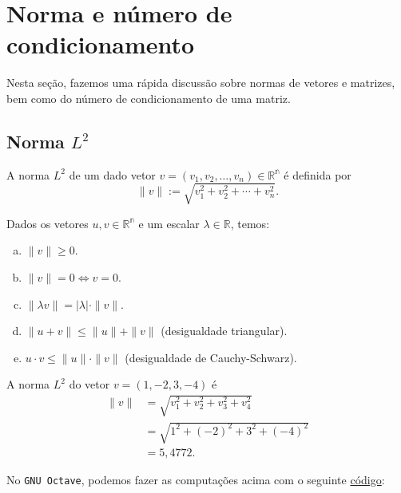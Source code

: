 \section{Norma e número de condicionamento}\label{cap_sl_direto_sec_norma_numcond}

Nesta seção, fazemos uma rápida discussão sobre normas de vetores e matrizes, bem como do número de condicionamento de uma matriz.

\subsection{Norma $L^2$}

A norma $L^2$ de um dado vetor $v = (v_1, v_2, \dotsc, v_n) \in \mathbb{R^n}$ é definida por
\begin{equation}
  \|v\| := \sqrt{v_1^2 + v_2^2 + \cdots + v_n^2}.
\end{equation}

\begin{prop}
  Dados os vetores $u,v \in \mathbb{R^n}$ e um escalar $\lambda\in\mathbb{R}$, temos:
  \begin{enumerate}[a)]
  \item $\|v\| \geq 0$.
  \item $\|v\| = 0 \Leftrightarrow v=0$.
  \item $\|\lambda v\| = |\lambda|\cdot \|v\|$.
  \item $\|u+v\| \leq \|u\| + \|v\|$ (desigualdade triangular).
  \item $u\cdot v \leq \|u\|\cdot\|v\|$ (desigualdade de Cauchy-Schwarz).
  \end{enumerate}
\end{prop}

\begin{ex}\label{ex:norma_vetor}
  A norma $L^2$ do vetor $v = (1, -2, 3, -4)$ é
  \begin{align}
    \|v\| &= \sqrt{v_1^2 + v_2^2 + v_3^2 + v_4^2}\\
    &= \sqrt{1^2 + (-2)^2 + 3^2 + (-4)^2}\\
    &= 5,4772.
  \end{align}

\ifisoctave
No \verb+GNU Octave+, podemos fazer as computações acima com o seguinte \href{https://github.com/phkonzen/notas/blob/master/src/MatematicaNumerica/cap_sl_direto/dados/ex_norma_vetor/ex_norma_vetor.m}{código}:

\fi
\end{ex}


